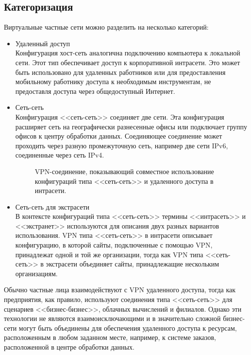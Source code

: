 \documentclass[a4page]{article}
\begin{document}
\subsection{Категоризация}
Виртуальные частные сети можно разделить на несколько категорий:
\begin{itemize}
\item Удаленный доступ\\
Конфигурация хост-сеть аналогична подключению компьютера к локальной сети. Этот тип обеспечивает доступ к корпоративной интрасети. Это может быть использовано для удаленных работников или для предоставления мобильному работнику доступа к необходимым инструментам, не предоставля доступа через общедоступный Интернет.

\item Сеть-сеть\\
Конфигурация <<сеть-сеть>> соединяет две сети. Эта конфигурация расширяет сеть на географически разнесенные офисы или подключает группу офисов к центру обработки данных. Соединяющее соединение может проходить через разную промежуточную сеть, например две сети IPv6, соединенные через сеть IPv4.

\begin{figure}

\caption{VPN-соединение, показывающий совместное использование конфигураций типа <<сеть-сеть>> и удаленного доступа в интрасети.}
\end{figure}

\item Сеть-сеть для экстрасети\\
  В контексте конфигураций типа <<сеть-сеть>> термины <<интрасеть>> и <<экстранет>>\cite{enwiki:extranet} используются для описания двух разных вариантов использования.\cite{rfc3809} VPN типа <<сеть-сеть>> в интрасети описывает конфигурацию, в которой сайты, подключенные с помощью VPN, принадлежат одной и той же организации, тогда как VPN типа <<сеть-сеть>> в экстрасети объединяет сайты, принадлежащие нескольким организациям.
\end{itemize}

Обычно частные лица взаимодействуют с VPN удаленного доступа, тогда как предприятия, как правило, используют соединения типа <<сеть-сеть>> для сценариев <<бизнес-бизнес>>, облачных вычислений и филиалов. Однако эти технологии не являются взаимоисключающими и в значительно сложной бизнес-сети могут быть объединены для обеспечения удаленного доступа к ресурсам, расположенным в любом заданном месте, например, к системе заказов, расположенной в центре обработки данных.
\end{document}
